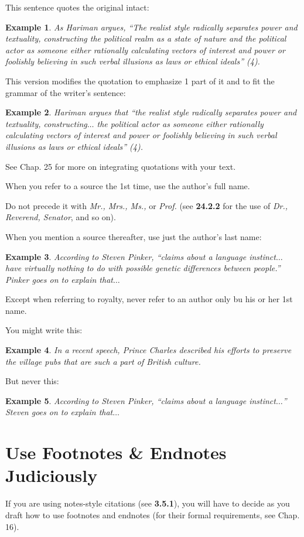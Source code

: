 \documentclass[oneside]{book}
\numberwithin{equation}{section}
\newtheorem{example}{Example}[section]
\begin{document}
This sentence quotes the original intact:
\begin{example}
    As Hariman argues, ``The realist style radically separates power and textuality, constructing the political realm as a state of nature and the political actor as someone either rationally calculating vectors of interest and power or foolishly believing in such verbal illusions as laws or ethical ideals'' (4).
\end{example}
This version modifies the quotation to emphasize 1 part of it and to fit the grammar of the writer's sentence:
\begin{example}
    Hariman argues that ``the realist style radically separates power and textuality, constructing$\ldots$ the political actor as someone either rationally calculating vectors of interest and power or foolishly believing in such verbal illusions as laws or ethical ideals'' (4).
\end{example}
See Chap. 25 for more on integrating quotations with your text.

%
When you refer to a source the 1st time, use the author's full name.

Do not precede it with \textit{Mr., Mrs., Ms.,} or \textit{Prof.} (see \textbf{24.2.2} for the use of \textit{Dr., Reverend, Senator}, and so on).

When you mention a source thereafter, use just the author's last name:
\begin{example}
    According to Steven Pinker, ``claims about a language instinct$\ldots$ have virtually nothing to do with possible genetic differences between people.'' Pinker goes on to explain that$\ldots$
\end{example}
Except when referring to royalty, never refer to an author only bu his or her 1st name.

You might write this:
\begin{example}
    In a recent speech, Prince Charles described his efforts to preserve the village pubs that are such a part of British culture.
\end{example}
But never this:
\begin{example}
    According to Steven Pinker, ``claims about a language instinct$\ldots$'' Steven goes on to explain that$\ldots$
\end{example}

\section{Use Footnotes \& Endnotes Judiciously}
If you are using notes-style citations (see \textbf{3.5.1}), you will have to decide as you draft how to use footnotes and endnotes (for their formal requirements, see Chap. 16).
\end{document}
